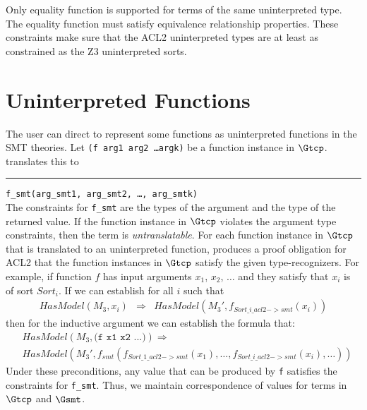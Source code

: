 Only equality function is supported for terms of the same uninterpreted type.
The equality function must satisfy equivalence relationship properties. These
constraints make sure that the ACL2 uninterpreted types are at least as
constrained as the Z3 uninterpreted sorts.

\section{Uninterpreted Functions}\label{sec:sounduninterfun}
The user can direct \smtlink{} to represent some functions as uninterpreted
functions in the \acs{SMT} theories.
Let \texttt{(f arg1 arg2 \ldots argk)} be a function instance in $\Gtcp$.
\smtlink{} translates this to\\
\rule{2em}{0ex}\texttt{f\_smt(arg\_smt1, arg\_smt2, \ldots, arg\_smtk)}\\
The constraints for \texttt{f\_smt} are the types of the argument and the type
of the returned value.
If the function instance in $\Gtcp$ violates the argument type constraints, then
the term is \emph{untranslatable}.
For each function instance in $\Gtcp$ that is translated to an uninterpreted
function, \smtlink{} produces a proof obligation for ACL2 that the function
instances in $\Gtcp$ satisfy the given type-recognizers. For example, if
function $f$ has input arguments $x_1$, $x_2$, $\ldots$ and they satisfy that
$x_i$ is of sort $Sort_i$. If we can establish for all $i$ such that
\begin{equation}\label{eq:uninterbase}\begin{array}{rcl}
HasModel(M_3, x_i) &\Rightarrow& HasModel(M_3', f_{Sort\_i\_acl2->smt}(x_i))
\end{array}\end{equation}
then for the inductive argument we can establish the formula that:
\begin{equation}\label{eq:uninterinductive}\begin{array}{rcl}
&HasModel(M_3, \texttt{(f x1 x2 ...)}) \Rightarrow \\
&HasModel(M_3', f_{smt}(f_{Sort\_1\_acl2->smt}(x_1), \ldots, f_{Sort\_i\_acl2->smt}(x_i), \ldots))
\end{array}\end{equation}
Under these preconditions, any value that can be produced by \texttt{f}
satisfies the constraints for \texttt{f\_smt}.
Thus, we maintain correspondence of values for terms in $\Gtcp$ and $\Gsmt$.

